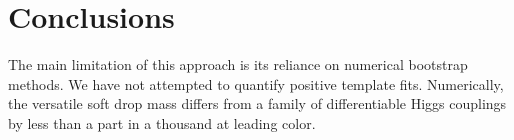 \section{Conclusions}\label{sec:conclusions}

The main limitation of this approach is its reliance on numerical
bootstrap methods. We have not attempted to quantify positive template
fits. Numerically, the versatile soft drop mass differs from a family of
differentiable Higgs couplings by less than a part in a thousand at
leading color.

